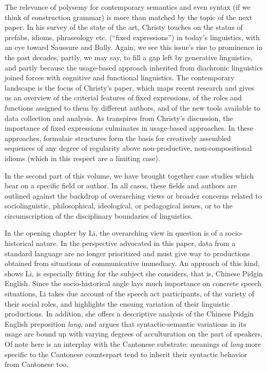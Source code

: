 \documentclass[output=paper]{langsci/langscibook}
\begin{document}
The relevance of polysemy for contemporary semantics and even syntax (if we think of construction grammar) is more than matched by the topic of the next paper. In his survey of the state of the art, Christy touches on the status of prefabs, idioms, phraseology etc. (``fixed expressions'') in today's linguistics, with an eye toward Saussure and Bally. Again, we see this issue's rise to prominence in the past decades, partly, we may say, to fill a gap left by generative linguistics, and partly because the usage-based approach inherited from diachronic linguistics joined forces with cognitive and functional linguistics. The contemporary landscape is the focus of Christy's paper, which maps recent research and gives us an overview of the criterial features of fixed expressions, of the roles and functions assigned to them by different authors, and of the new tools available to data collection and analysis. As transpires from Christy's discussion, the importance of fixed expressions culminates in usage-based approaches. In these approaches, formulaic structures form the basis for creatively assembled sequences of any degree of regularity above non-productive, non-compositional idioms (which in this respect are a limiting case).

In the second part of this volume, we have brought together case studies which bear on a specific field or author. In all cases, these fields and authors are outlined against the backdrop of overarching views or broader concerns related to sociolinguistic, philosophical, ideological, or pedagogical issues, or to the circumscription of the disciplinary boundaries of linguistics.

In the opening chapter by Li, the overarching view in question is of a socio-historical nature. In the perspective advocated in this paper, data from a standard language are no longer prioritized and must give way to productions obtained from situations of communicative immediacy. An approach of this kind, shows Li, is especially fitting for the subject she considers, that is, Chinese Pidgin English. Since the socio-historical angle lays much importance on concrete speech situations, Li takes due account of the speech act participants, of the variety of their social roles, and highlights the ensuing variation of their linguistic productions. In addition, she offers a descriptive analysis of the Chinese Pidgin English preposition \emph{long}, and argues that syntactic-semantic variations in its usage are bound up with varying degrees of acculturation on the part of speakers. Of note here is an interplay with the Cantonese substrate: meanings of \emph{long} more specific to the Cantonese counterpart tend to inherit their syntactic behavior from Cantonese too. 
\end{document}
